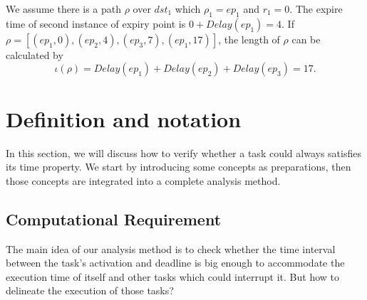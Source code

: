 \documentclass[sigconf]{acmart}
\begin{document}
We assume there is a path $\rho$ over $dst_1$ which $\rho_1=ep_1$ and $r_1=0$. The expire time of second instance of expiry point is $0+Delay(ep_1)=4$. If $\rho=[(ep_1,0),(ep_2,4),(ep_3,7),(ep_1,17)]$, the length of $\rho$ can be calculated by
\[\iota(\rho)=Delay(ep_1)+Delay(ep_2)+Delay(ep_3)=17.\]

\section{Definition and notation}\label{concept}
In this section, we will discuss how to verify whether a task could always satisfies its time property. We start by introducing some concepts as preparations, then those concepts are integrated into a complete analysis method.

\subsection{Computational Requirement}
The main idea of our analysis method is to check whether the time interval between the task's activation and deadline is big enough to accommodate the execution time of itself and other tasks which could interrupt it. But how to delineate the execution of those tasks?
\end{document}
